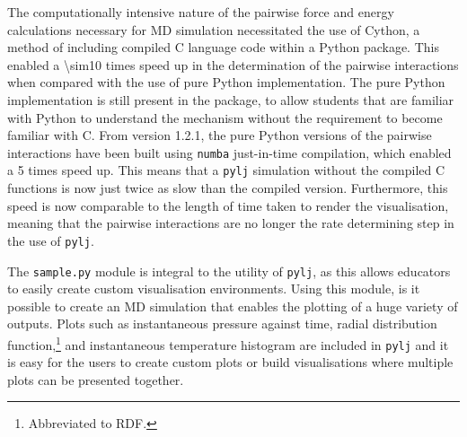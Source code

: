 The computationally intensive nature of the pairwise force and energy calculations necessary for MD simulation necessitated the use of Cython, a method of including compiled C language code within a Python package.
This enabled a \num{\sim10} times speed up in the determination of the pairwise interactions when compared with the use of pure Python implementation.
The pure Python implementation is still present in the package, to allow students that are familiar with Python to understand the mechanism without the requirement to become familiar with C.
From version 1.2.1, the pure Python versions of the pairwise interactions have been built using \texttt{numba} just-in-time compilation, which enabled a \num{5} times speed up.
This means that a \texttt{pylj} simulation without the compiled C functions is now just twice as slow than the compiled version.
Furthermore, this speed is now comparable to the length of time taken to render the visualisation, meaning that the pairwise interactions are no longer the rate determining step in the use of \texttt{pylj}.

The \texttt{sample.py} module is integral to the utility of \texttt{pylj}, as this allows educators to easily create custom visualisation environments.
Using this module, is it possible to create an MD simulation that enables the plotting of a huge variety of outputs.
Plots such as instantaneous pressure against time, radial distribution function,\footnote{Abbreviated to RDF.}  and instantaneous temperature histogram are included in \texttt{pylj} and it is easy for the users to create custom plots or build visualisations where multiple plots can be presented together.

